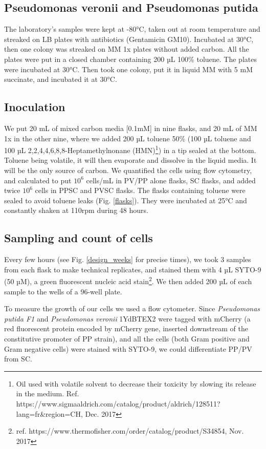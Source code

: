 \documentclass[a4paper, 10pt, conference]{ieeeconf}   %
\begin{document}
\subsection{Pseudomonas veronii and Pseudomonas putida}
The laboratory's samples were kept at -80°C, taken out at room temperature and streaked on LB plates with antibiotics (Gentamicin GM10). Incubated at 30°C, then one colony was streaked on MM 1x plates without added carbon. All the plates were put in a closed chamber containing 200 µL 100\% toluene. The plates were incubated at 30°C. Then took one colony, put it in liquid MM with 5 mM succinate, and incubated it at 30°C.

\subsection{Inoculation}
We put 20 mL of mixed carbon media [0.1mM] in nine flasks, and 20 mL of MM 1x in the other nine, where we added 200 µL toluene  50\% (100 µL toluene and 100 µL 2,2,4,4,6,8,8-Heptamethylnonane (HMN)\footnote{Oil used with volatile solvent to decrease their toxicity by slowing its release in the medium. Ref. https://www.sigmaaldrich.com/catalog/product/aldrich/128511?lang\linebreak[0]=fr\&region=CH, Dec. 2017}) in a tip sealed at the bottom. Toluene being volatile, it will then evaporate and dissolve in the liquid media. It will be the only source of carbon. We quantified the cells using flow cytometry, and calculated to put $10^{6}$ cells/mL in PV/PP alone flasks, SC flasks, and added twice $10^{6}$ cells in PPSC and PVSC flasks. The flasks containing toluene were sealed to avoid toluene leaks (Fig. \ref{flasks}).
They were incubated at 25°C and constantly shaken at 110rpm during 48 hours.

\subsection{Sampling and count of cells}
Every few hours (see Fig. \ref{design_weeks} for precise times), we took 3 samples from each flask to make technical replicates, and stained them with 4 µL SYTO-9 (50 µM), a  green fluorescent nucleic acid stain\footnote{ref. https://www.thermofisher.com/order/catalog/product/S34854, Nov. 2017}.  We then added 200 µL of each sample to the wells of a 96-well plate.

To measure the growth of our cells we used a flow cytometer. 
Since \textit{Pseudomonas putida F1} and \textit{Pseudomonas veronii} 1YdBTEX2 were tagged with mCherry (a red fluorescent protein encoded by mCherry gene, inserted downstream of the constitutive promoter of PP strain), and all the cells (both Gram positive and Gram negative cells) were stained with SYTO-9, we could differentiate PP/PV from SC. 
%  
\end{document}
